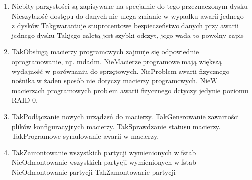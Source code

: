 \begin{enumerate}
	\newpage
	\item {}%
	{Nie}{bity parzystości są zapisywane na specjalnie do tego przeznaczonym dysku}%
	{Nie}{szybkość dostępu do danych nie ulega zmianie w wypadku awarii jednego z dysków}%
	{Tak}{gwarantuje stuprocentowe bezpieczeństwo danych przy awarii jednego dysku}%
	{Tak}{jego zaletą jest szybki odczyt, jego wada to powolny zapis}
	\item {}%
	{Tak}{Obsługą macierzy programowych zajmuje się odpowiednie oprogramowanie, np. mdadm.}%
	{Nie}{Macierze programowe mają większą wydajność w porównaniu do sprzętowych.}%
	{Nie}{Problem awarii fizycznego nośnika w żaden sposób nie dotyczy macierzy programowych.}%
	{Nie}{W macierzach programowych problem awarii fizycznego dotyczy jedynie poziomu RAID 0.}
	\item {}%
	{Tak}{Podłączanie nowych urządzeń do macierzy.}%
	{Tak}{Generowanie zawartości plików konfiguracyjnych macierzy.}%
	{Tak}{Sprawdzanie statusu macierzy.}%
	{Tak}{Programowe symulowanie awarii w macierzy.}
	\item {}%
	{Tak}{Zamontowanie wszystkich partycji wymienionych w fstab}%
	{Nie}{Odmontowanie wszystkich partycji wymienionych w fstab}%
	{Nie}{Odmontowanie partycji}%
	{Tak}{Zamontowanie partycji}
	
	
\end{enumerate}
